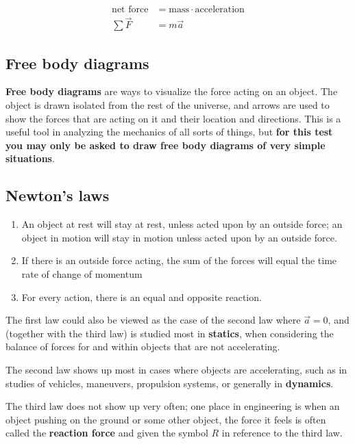 \documentclass{tufte-handout}
\providecommand{\tightlist}{%
  \setlength{\itemsep}{0pt}\setlength{\parskip}{0pt}}
\begin{document}
\begin{align}
\text{net force} &= \text{mass} \cdot \text{acceleration} \\
\sum\vec{F} &= m\vec{a}
\end{align}

\hypertarget{free-body-diagrams}{%
\subsection{Free body diagrams}\label{free-body-diagrams}}

\textbf{Free body diagrams} are ways to visualize the force acting on an
object. The object is drawn isolated from the rest of the universe, and
arrows are used to show the forces that are acting on it and their
location and directions. This is a useful tool in analyzing the
mechanics of all sorts of things, but \textbf{for this test you may only
be asked to draw free body diagrams of very simple
situations}.

\hypertarget{newtons-laws}{%
\subsection{Newton's laws}\label{newtons-laws}}

\begin{enumerate}
\def\labelenumi{\arabic{enumi}.}
\tightlist
\item
  An object at rest will stay at rest, unless acted upon by an outside
  force; an object in motion will stay in motion unless acted upon by an
  outside force.
\item
  If there is an outside force acting, the sum of the forces will equal
  the time rate of change of
  momentum
\item
  For every action, there is an equal and opposite reaction.
\end{enumerate}

The first law could also be viewed as the case of the second law where
\(\vec{a}=0\), and (together with the third law) is studied most in
\textbf{statics}, when considering the balance of forces for and within objects that
are not accelerating.

The second law shows up most in cases where objects are accelerating,
such as in studies of vehicles, maneuvers, propulsion systems, or
generally in
\textbf{dynamics}.

The third law does not show up very often; one place in engineering is
when an object pushing on the ground or some other object, the force it
feels is often called the \textbf{reaction force} and given the symbol
\(R\) in reference to the third law.
\end{document}
